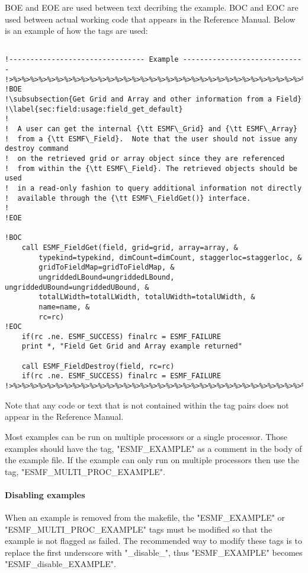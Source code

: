 BOE and EOE are used between text decribing the example. BOC and EOC are used between
actual working code that appears in the Reference Manual. Below is an example of how
the tags are used:

\begin{verbatim}

!-------------------------------- Example -----------------------------
!>%>%>%>%>%>%>%>%>%>%>%>%>%>%>%>%>%>%>%>%>%>%>%>%>%>%>%>%>%>%>%>%>%>%>%
!BOE
!\subsubsection{Get Grid and Array and other information from a Field}
!\label{sec:field:usage:field_get_default}
!
!  A user can get the internal {\tt ESMF\_Grid} and {\tt ESMF\_Array}
!  from a {\tt ESMF\_Field}.  Note that the user should not issue any destroy command
!  on the retrieved grid or array object since they are referenced
!  from within the {\tt ESMF\_Field}. The retrieved objects should be used
!  in a read-only fashion to query additional information not directly
!  available through the {\tt ESMF\_FieldGet()} interface.
!
!EOE

!BOC
    call ESMF_FieldGet(field, grid=grid, array=array, &
        typekind=typekind, dimCount=dimCount, staggerloc=staggerloc, &
        gridToFieldMap=gridToFieldMap, &
        ungriddedLBound=ungriddedLBound, ungriddedUBound=ungriddedUBound, &
        totalLWidth=totalLWidth, totalUWidth=totalUWidth, &
        name=name, &
        rc=rc)
!EOC
    if(rc .ne. ESMF_SUCCESS) finalrc = ESMF_FAILURE
    print *, "Field Get Grid and Array example returned"

    call ESMF_FieldDestroy(field, rc=rc)
    if(rc .ne. ESMF_SUCCESS) finalrc = ESMF_FAILURE
!>%>%>%>%>%>%>%>%>%>%>%>%>%>%>%>%>%>%>%>%>%>%>%>%>%>%>%>%>%>%>%>%>%>%>%

\end{verbatim}

Note that any code or text that is not contained within the tag pairs does not appear in the
Reference Manual.

Most examples can be run on multiple processors or a single processor. Those examples should
have the tag, "ESMF\_EXAMPLE" as a comment in the body of the example file. If the example
can only run on multiple processors then use the tag, "ESMF\_MULTI\_PROC\_EXAMPLE".

\paragraph{Disabling examples}
When an example is removed from the makefile, the "ESMF\_EXAMPLE" or 
"ESMF\_MULTI\_PROC\_EXAMPLE"
tags must be modified so that the example is not flagged as failed. 
The recommended way to modify these tags is to replace the first underscore with "\_disable\_", 
thus "ESMF\_EXAMPLE" becomes
"ESMF\_disable\_EXAMPLE".


